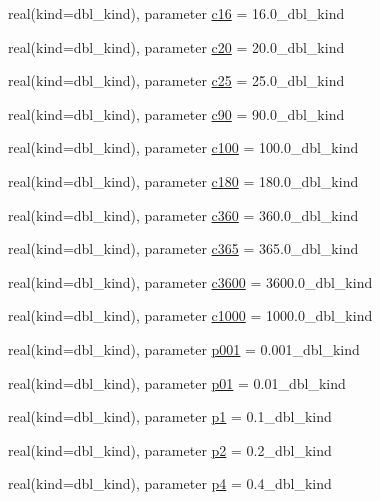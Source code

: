 \begin{DoxyCompactItemize}
\item 
real(kind=dbl\_\-kind), parameter \hyperlink{namespaceice__constants_aaa41418681ab232e158cb3a792321df8}{c16} = 16.0\_\-dbl\_\-kind
\item 
real(kind=dbl\_\-kind), parameter \hyperlink{namespaceice__constants_a19a6a387f7968c6067c1ff9c1d5f0b45}{c20} = 20.0\_\-dbl\_\-kind
\item 
real(kind=dbl\_\-kind), parameter \hyperlink{namespaceice__constants_a5db59b63c17c3ed647e3cdd61b04793c}{c25} = 25.0\_\-dbl\_\-kind
\item 
real(kind=dbl\_\-kind), parameter \hyperlink{namespaceice__constants_ab5bd5778b3d35bf4689b364fdb86f852}{c90} = 90.0\_\-dbl\_\-kind
\item 
real(kind=dbl\_\-kind), parameter \hyperlink{namespaceice__constants_a64d8a1f5f872985a8ef291758a414275}{c100} = 100.0\_\-dbl\_\-kind
\item 
real(kind=dbl\_\-kind), parameter \hyperlink{namespaceice__constants_a4090f4acc886fcf5ff13e21846607eca}{c180} = 180.0\_\-dbl\_\-kind
\item 
real(kind=dbl\_\-kind), parameter \hyperlink{namespaceice__constants_a36d55ec278e51e0964603b90df1aa54c}{c360} = 360.0\_\-dbl\_\-kind
\item 
real(kind=dbl\_\-kind), parameter \hyperlink{namespaceice__constants_af62bc1ea152c6785b0994e700eef3645}{c365} = 365.0\_\-dbl\_\-kind
\item 
real(kind=dbl\_\-kind), parameter \hyperlink{namespaceice__constants_aa44b288005725c33c91c21cc15751b54}{c3600} = 3600.0\_\-dbl\_\-kind
\item 
real(kind=dbl\_\-kind), parameter \hyperlink{namespaceice__constants_a489137702b8f265b58dc91f04e4145d4}{c1000} = 1000.0\_\-dbl\_\-kind
\item 
real(kind=dbl\_\-kind), parameter \hyperlink{namespaceice__constants_a32bc94e42275169979f5be642d23634e}{p001} = 0.001\_\-dbl\_\-kind
\item 
real(kind=dbl\_\-kind), parameter \hyperlink{namespaceice__constants_a985c2a8f778734c09e77d0a0cdaaa190}{p01} = 0.01\_\-dbl\_\-kind
\item 
real(kind=dbl\_\-kind), parameter \hyperlink{namespaceice__constants_a2defc12f4f68fac27d1f0b4848b9d77e}{p1} = 0.1\_\-dbl\_\-kind
\item 
real(kind=dbl\_\-kind), parameter \hyperlink{namespaceice__constants_a14e6139c0f7bfd47c5fed3e88620be22}{p2} = 0.2\_\-dbl\_\-kind
\item 
real(kind=dbl\_\-kind), parameter \hyperlink{namespaceice__constants_aa6ad846377c0f3b955303559a2262b78}{p4} = 0.4\_\-dbl\_\-kind

\end{DoxyCompactItemize}
